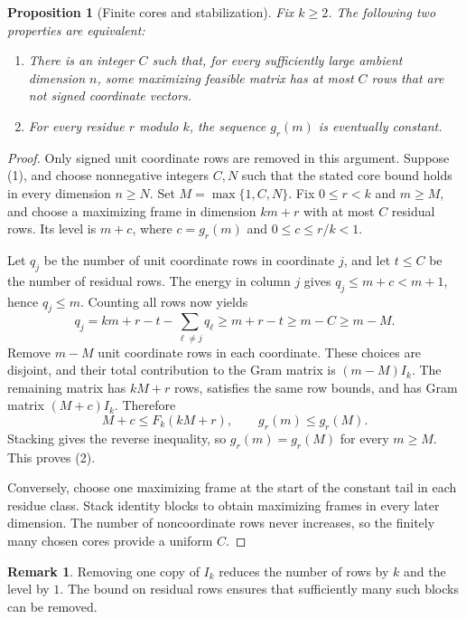 \documentclass[11pt]{article}
\numberwithin{equation}{section}
\newtheorem{proposition}[proposition]{Proposition}
\theoremstyle{definition}
\theoremstyle{definition}
\newtheorem{remark}[remark]{Remark}
\begin{document}
\begin{proposition}[Finite cores and stabilization]\label{prop:finite-core}
Fix $k\ge2$. The following two properties are equivalent:
\begin{enumerate}
\item There is an integer $C$ such that, for every sufficiently large
ambient dimension $n$, some maximizing feasible matrix has at most $C$
rows that are not signed coordinate vectors.
\item For every residue $r$ modulo $k$, the sequence $g_r(m)$ is eventually
constant.
\end{enumerate}
\end{proposition}
\begin{proof}
Only signed unit coordinate rows are removed in this argument.
Suppose (1), and choose nonnegative integers $C,N$ such that the stated
core bound holds in every dimension $n\ge N$. Set
$M=\max\{1,C,N\}$. Fix $0\le r<k$ and $m\ge M$, and choose a maximizing
frame in dimension $km+r$ with at most $C$ residual rows. Its level is
$m+c$, where $c=g_r(m)$ and $0\le c\le r/k<1$.

Let $q_j$ be the number of unit coordinate rows in coordinate $j$, and let $t\le C$
be the number of residual rows. The energy in column $j$ gives
$q_j\le m+c<m+1$, hence $q_j\le m$. Counting all rows now yields
\[
 q_j=km+r-t-\sum_{\ell\ne j}q_\ell
 \ge m+r-t\ge m-C\ge m-M.
\]
Remove $m-M$ unit coordinate rows in each coordinate. These choices are disjoint,
and their total contribution to the Gram matrix is $(m-M)I_k$.
The remaining matrix has $kM+r$ rows, satisfies the same row bounds,
and has Gram matrix $(M+c)I_k$. Therefore
\[
 M+c\le F_k(kM+r),\qquad g_r(m)\le g_r(M).
\]
Stacking gives the reverse inequality, so $g_r(m)=g_r(M)$ for every
$m\ge M$. This proves (2).

Conversely, choose one maximizing frame at the start of the constant
tail in each residue class. Stack identity blocks to obtain maximizing
frames in every later dimension. The number of noncoordinate rows
never increases, so the finitely many chosen cores provide a uniform $C$.
\end{proof}

\begin{remark}
Removing one copy of $I_k$ reduces the number of rows by $k$
and the level by $1$.  The bound on residual rows ensures that
sufficiently many such blocks can be removed.
\end{remark}
\end{document}
